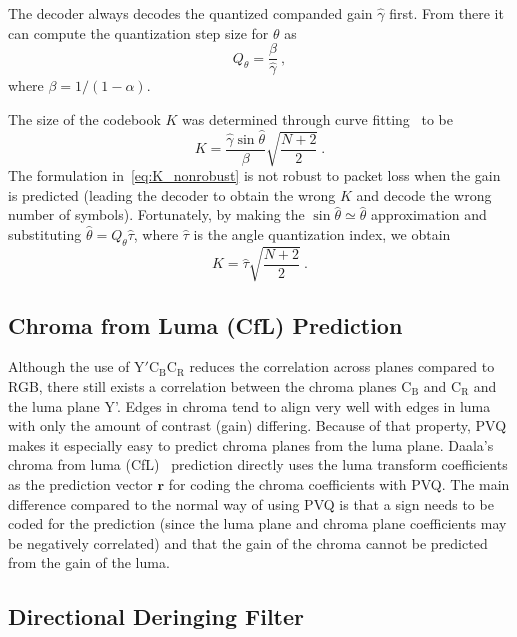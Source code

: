 \documentclass[english,conference,10pt]{IEEEtran}
\begin{document}
The decoder always decodes the quantized companded gain $\hat{\gamma}$
first. From there it can compute the quantization step size for $\theta$ as
\begin{equation}
Q_\theta = \frac{\beta}{\hat{\gamma}}\ ,
\end{equation}
where $\beta = 1/(1-\alpha)$.

The size of the codebook $K$ was determined through curve
fitting~\cite{valin2015spie} to be
\begin{equation}
K = \frac{\hat{\gamma}\sin\hat{\theta}}{\beta}\sqrt{\frac{N+2}{2}}\ .
\label{eq:K_nonrobust}
\end{equation}
The formulation in~\cref{eq:K_nonrobust} is not robust to packet loss when
the gain is predicted (leading the decoder to obtain the wrong $K$ and decode
the wrong number of symbols). Fortunately, by making the $\sin{\hat{\theta}}
\simeq \hat{\theta}$ approximation and substituting $\hat{\theta} = 
Q_\theta\hat{\tau}$, where $\hat{\tau}$ is the angle quantization index, we obtain
\begin{equation}
K = \hat{\tau} \sqrt{\frac{N+2}{2}}\ .
\end{equation}


\subsection{Chroma from Luma (CfL) Prediction}

Although the use of $\mathrm{Y'C_BC_R}$ reduces the correlation across planes
compared to RGB, there still exists a correlation between the chroma planes
$\mathrm{C_B}$ and $\mathrm{C_R}$ and the luma plane Y'. Edges in chroma tend to
align very well with edges in luma with only the amount of contrast (gain) differing.
Because of that property, PVQ makes it especially easy to predict
chroma planes from the luma plane. Daala's chroma from luma (CfL)~\cite{egge2015spie}
prediction directly uses the luma transform coefficients as the prediction vector
$\mathbf{r}$ for coding the chroma coefficients with PVQ. The main difference compared
to the normal way of using PVQ is that a sign needs to be coded for the prediction
(since the luma plane and chroma plane coefficients may be negatively correlated) and
that the gain of the chroma cannot be predicted from the gain of the luma.


\subsection{Directional Deringing Filter}
\label{sec:deringing}
\end{document}
